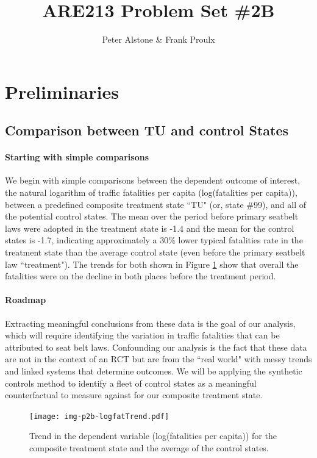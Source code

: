 \documentclass[letterpaper, 12pt]{article}
\begin{document}
\title{ARE213 Problem Set \#2B}
\author{Peter Alstone \& Frank Proulx}
\maketitle

\section{Preliminaries}

\subsection{Comparison between TU and control States}

\paragraph{Starting with simple comparisons}
We begin with simple comparisons between the dependent outcome of interest, the natural logarithm of traffic fatalities per capita (log(fatalities per capita)), between a predefined composite treatment state ``TU" (or, state \#99), and all of the potential control states.  The mean over the period before primary seatbelt laws were adopted in the treatment state is -1.4 and the mean for the control states is -1.7, indicating approximately a 30\% lower typical fatalities rate in the treatment state than the average control state (even before the primary seatbelt law ``treatment").  The trends for both shown in Figure \ref{fig:a11} show that overall the fatalities were on the decline in both places before the treatment period.  

\paragraph{Roadmap}
Extracting meaningful conclusions from these data is the goal of our analysis, which will require identifying the variation in traffic fatalities that can be attributed to seat belt laws.  Confounding our analysis is the fact that these data are not in the context of an RCT but are from the ``real world" with messy trends and linked systems that determine outcomes.  We will be applying the synthetic controls method to identify a fleet of control states as a meaningful counterfactual to measure against for our composite treatment state.  

\begin{figure}[htbp]
\begin{center}
\texttt{[image: img-p2b-logfatTrend.pdf]}
\caption{Trend in the dependent variable (log(fatalities per capita)) for the composite treatment state and the average of the control states.}
\label{fig:a11}
\end{center}
\end{figure}
\end{document}
